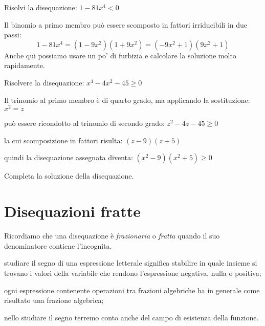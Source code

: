 \begin{esempio}
Risolvi la disequazione: \(1-81x^4<0\)

Il binomio a primo membro può essere scomposto in fattori irriducibili in due
passi:
\[1-81x^4 = \left(1-9x^2\right)\left(1+9x^2\right)=
  \left(-9x^2+1\right)\left(9x^2+1\right)\]
Anche qui possiamo usare un po' di furbizia e calcolare la soluzione molto
rapidamente.
\end{esempio}

\begin{esempio}
Risolvere la disequazione: \(x^4-4x^2-45 \ge 0\)

Il trinomio al primo membro è di quarto grado, ma applicando la
sostituzione:
\(x^2=z\)

può essere ricondotto al trinomio di secondo grado:
\(z^2-4z-45 \ge 0\)

la cui scomposizione in fattori risulta:
\(\left(z-9\right)\left(z+5\right)\)

quindi la disequazione assegnata diventa:
\((x^2-9)(x^2+5) \ge 0\)

Completa la soluzione della disequazione.
\end{esempio}

%


\section{Disequazioni fratte}
\label{sec:diseq_fratte}

Ricordiamo che una disequazione è \emph{frazionaria} o \emph{fratta} quando
il suo denominatore contiene l'incognita.

\begin{osservazione}
 \begin{itemize*}
\item studiare il segno di una espressione letterale significa stabilire in
quale insieme si trovano i valori della variabile che rendono
l'espressione negativa, nulla o positiva;
\item ogni espressione contenente operazioni tra frazioni algebriche ha in
generale come risultato una frazione algebrica;
\item nello studiare il segno terremo conto anche del campo di esistenza
della funzione.
\end{itemize*}
\end{osservazione}

